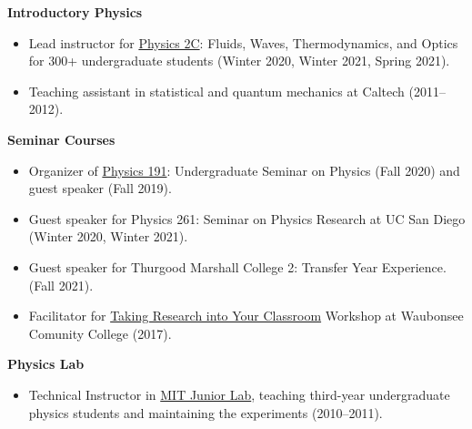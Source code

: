 \documentclass[11pt]{res}
\begin{document}
\begin{resume}
  \textbf{Introductory Physics}
  \begin{itemize}
    \itemsep-0.3em
    \item Lead instructor for \href{https://jduarte.physics.ucsd.edu/phys2c/index.html}{Physics 2C}: Fluids, Waves, Thermodynamics, and Optics for 300+ undergraduate students ({Winter 2020, Winter 2021, Spring 2021}).
    \item Teaching assistant in statistical and quantum mechanics at Caltech ({2011--2012}).
  \end{itemize}

  \textbf{Seminar Courses}
  \begin{itemize}
    \itemsep-0.3em
    \item Organizer of \href{https://indico.cern.ch/event/956641/}{Physics 191}: Undergraduate Seminar on Physics ({Fall 2020}) and guest speaker ({Fall 2019}).
    \item Guest speaker for Physics 261: Seminar on Physics Research at UC San Diego ({Winter 2020, Winter 2021}).
    \item Guest speaker for Thurgood Marshall College 2: Transfer Year Experience. ({Fall 2021}).
    \item Facilitator for \href{http://eddata.fnal.gov/lasso/program_search/show_workshopID_new.lasso?event_id=435}{Taking Research into Your Classroom} Workshop at Waubonsee Comunity College ({2017}).
  \end{itemize}


  \textbf{Physics Lab}
  \begin{itemize}
    \itemsep-0.3em
    \item Technical Instructor in \href{http://web.mit.edu/8.13/www/index.shtml}{MIT Junior Lab}, teaching third-year undergraduate physics students and maintaining the experiments ({2010--2011}).
  \end{itemize}



\end{resume}
\end{document}
